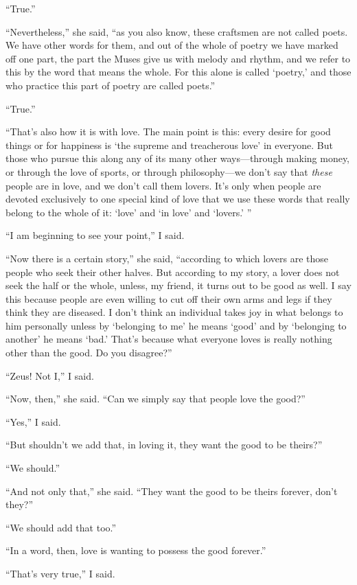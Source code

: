 “True.”

“Nevertheless,” she said, “as you also know, these craftsmen are not
called poets. We have other words for them, and out of the whole of
poetry we have marked off one part, the part the Muses give us with
melody and rhythm, and we refer to this by the word that means the
whole. For this alone is called ‘poetry,’ and those who practice this
part of poetry are called poets.”

 “True.”

“That’s also how it is with love. The main point is this: every desire
for good things or for happiness is ‘the supreme and treacherous love’
in everyone. But those who pursue this along any of its many other
ways---through making money, or through the love of sports, or through
philosophy---we don’t say that {\em these} people are in love, and we
don’t call them lovers. It’s only when people are devoted exclusively to
one special kind of love that we use these words that really belong to
the whole of it: ‘love’ and ‘in love’ and ‘lovers.’ ”

“I am beginning to see your point,” I said.

 “Now there is a certain story,” she said, “according to which
lovers are those people who seek their other halves. But according to my
story, a lover does not seek the half or the whole, unless, my friend,
it turns out to be good as well. I say this because people are even
willing to cut off their own arms and legs if they think they are
diseased. I don’t think an individual takes joy in what belongs to him
personally unless by ‘belonging to me’ he means ‘good’ and by ‘belonging
to another’ he means ‘bad.’ That’s because what everyone loves is really
nothing other than the good.  Do you disagree?”

“Zeus! Not I,” I said.

“Now, then,” she said. “Can we simply say that people love the good?”

“Yes,” I said.

“But shouldn’t we add that, in loving it, they want the good to be
theirs?”

“We should.”

“And not only that,” she said. “They want the good to be theirs forever,
don’t they?”

“We should add that too.”

“In a word, then, love is wanting to possess the good forever.”

“That’s very true,” I said. 


